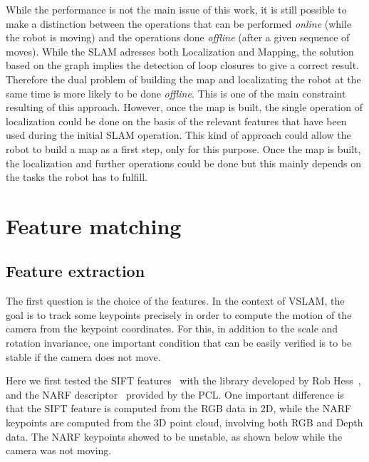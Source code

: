 While the performance is not the main issue of this work, it is still possible to make a distinction between the operations that can be performed \emph{online} (while the robot is moving) and the operations done \emph{offline} (after a given sequence of moves). While the \gls{SLAM} adresses both Localization and Mapping, the solution based on the graph implies the detection of loop closures to give a correct result. Therefore the dual problem of building the map and localizating the robot at the same time is more likely to be done \emph{offline}. This is one of the main constraint resulting of this approach. However, once the map is built, the single operation of localization could be done on the basis of the relevant features that have been used during the initial \gls{SLAM} operation. This kind of approach could allow the robot to build a map as a first step, only for this purpose. Once the map is built, the localization and further operations could be done but this mainly depends on the tasks the robot has to fulfill.

\chapter{Feature matching}
\label{chap:features}

\section{Feature extraction}

The first question is the choice of the features. In the context of \gls{VSLAM}, the goal is to track some keypoints precisely in order to compute the motion of the camera from the keypoint coordinates. For this, in addition to the scale and rotation invariance, one important condition that can be easily verified is to be stable if the camera does not move. 

Here we first tested the \gls{SIFT} features~\cite{lowe_2004_sift} with the library developed by Rob Hess~\cite{hess_sift}, and the \gls{NARF} descriptor~\cite{steder10irosws} provided by the \gls{PCL}. One important difference is that the \gls{SIFT} feature is computed from the RGB data in 2D, while the \gls{NARF} keypoints are computed from the 3D point cloud, involving both RGB and Depth data.
The \gls{NARF} keypoints showed to be unstable, as shown below while the camera was not moving.


